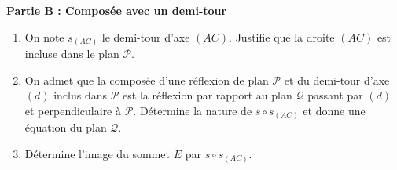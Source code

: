 \documentclass[11pt]{article}
\begin{document}
\begin{exercice}
\textbf{Partie B : Composée avec un demi-tour}
\begin{enumerate}
\item On note $s_{(AC)}$ le demi-tour d'axe $(AC)$. Justifie que la droite $(AC)$ est incluse dans le plan $\mathcal{P}$.
\item On admet que la composée d'une réflexion de plan $\mathcal{P}$ et du demi-tour d'axe $(d)$ inclus dans $\mathcal{P}$ est la réflexion par rapport au plan $\mathcal{Q}$ passant par $(d)$ et perpendiculaire à $\mathcal{P}$. Détermine la nature de $s \circ s_{(AC)}$ et donne une équation du plan $\mathcal{Q}$.
\item Détermine l'image du sommet $E$ par $s \circ s_{(AC)}$.
\end{enumerate}
\end{exercice}
\end{document}

